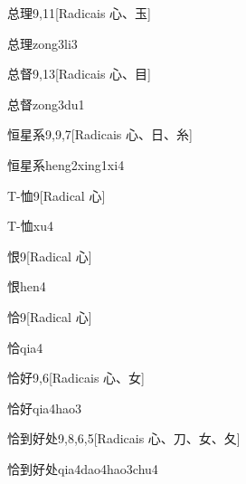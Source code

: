 \begin{entry}{总理}{9,11}[Radicais ⼼、⽟]
  \begin{phonetics}{总理}{zong3li3}
  \end{phonetics}
\end{entry}

\begin{entry}{总督}{9,13}[Radicais ⼼、⽬]
  \begin{phonetics}{总督}{zong3du1}
  \end{phonetics}
\end{entry}

\begin{entry}{恒星系}{9,9,7}[Radicais ⼼、⽇、⽷]
  \begin{phonetics}{恒星系}{heng2xing1xi4}
  \end{phonetics}
\end{entry}

\begin{entry}{T-恤}{9}[Radical ⼼]
  \begin{phonetics}{T-恤}{xu4}
  \end{phonetics}
\end{entry}

\begin{entry}{恨}{9}[Radical ⼼]
  \begin{phonetics}{恨}{hen4}
  \end{phonetics}
\end{entry}

\begin{entry}{恰}{9}[Radical ⼼]
  \begin{phonetics}{恰}{qia4}
  \end{phonetics}
\end{entry}

\begin{entry}{恰好}{9,6}[Radicais ⼼、⼥]
  \begin{phonetics}{恰好}{qia4hao3}
  \end{phonetics}
\end{entry}

\begin{entry}{恰到好处}{9,8,6,5}[Radicais ⼼、⼑、⼥、⼡]
  \begin{phonetics}{恰到好处}{qia4dao4hao3chu4}
  \end{phonetics}
\end{entry}

